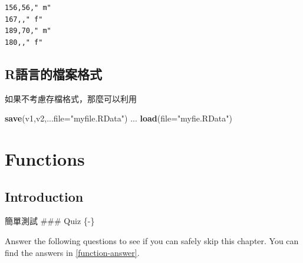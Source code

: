 \documentclass[]{book}
\newenvironment{Shaded}{\begin{snugshade}}{\end{snugshade}}
\newcommand{\DataTypeTok}[1]{\textcolor[rgb]{0.13,0.29,0.53}{#1}}
\newcommand{\KeywordTok}[1]{\textcolor[rgb]{0.13,0.29,0.53}{\textbf{#1}}}
\newcommand{\NormalTok}[1]{#1}
\newcommand{\StringTok}[1]{\textcolor[rgb]{0.31,0.60,0.02}{#1}}
\theoremstyle{definition}
\theoremstyle{definition}
\theoremstyle{definition}
\theoremstyle{remark}
\begin{document}
\begin{verbatim}
156,56," m"
167,," f"
189,70," m"
180,," f"
\end{verbatim}

\hypertarget{r}{%
\section{R語言的檔案格式}\label{r}}

如果不考慮存檔格式，那麼可以利用

\begin{Shaded}
\begin{Highlighting}[]
\KeywordTok{save}\NormalTok{(v1,v2,}\DataTypeTok{...file=}\StringTok{"myfile.RData"}\NormalTok{)}
\NormalTok{...}
\KeywordTok{load}\NormalTok{(}\DataTypeTok{file=}\StringTok{"myfie.RData"}\NormalTok{)}
\end{Highlighting}
\end{Shaded}

\hypertarget{functions}{%
\chapter{Functions}\label{functions}}

\hypertarget{introduction}{%
\section{Introduction}\label{introduction}}

簡單測試 \#\#\# Quiz \{-\}

Answer the following questions to see if you can safely skip this
chapter. You can find the answers in \ref{function-answer}.
\end{document}
